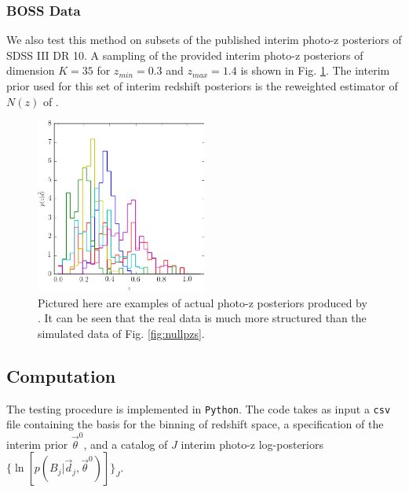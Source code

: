 \documentclass[preprint]{aastex}
\begin{document}
\clearpage
\subsubsection{BOSS Data}
\label{sec:data}

We also test this method on subsets of the published interim photo-z posteriors 
of SDSS III DR 10.  A sampling of the provided interim photo-z posteriors of 
dimension $K=35$ for $z_{min}=0.3$ and $z_{max}=1.4$ is shown in Fig. 
\ref{fig:datapzs}.  The interim prior used for this set of interim redshift 
posteriors is the reweighted estimator of $N(z)$ of \citet{Sheldon2012}.

\begin{figure}
\includegraphics[width=0.5\textwidth]{figs/boss/samplepzs.png}
\caption{Pictured here are examples of actual photo-z posteriors produced by 
\citet{Sheldon2012}.  It can be seen that the real data is much more structured 
than the simulated data of Fig. \ref{fig:nullpzs}.}
\label{fig:datapzs}
\end{figure}

\clearpage
\subsection{Computation}
\label{sec:mcmc}

The testing procedure is implemented in \texttt{Python}.  The code takes as 
input a \texttt{csv} file containing the basis for the binning of redshift 
space, a specification of the interim prior $\vec{\theta}^{0}$, and a catalog 
of $J$ interim photo-z log-posteriors 
$\{\ln[p(B_{j}|\vec{d}_{j},\vec{\theta}^{0})]\}_{J}$.
\end{document}
